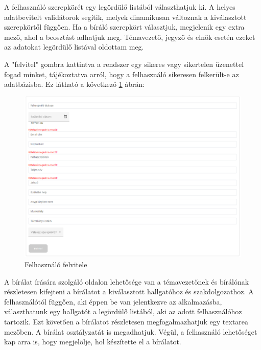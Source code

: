 A felhasználó szerepkörét egy legördülő listából választhatjuk ki. A helyes adatbevitelt validátorok segítik, melyek dinamikusan változnak a kiválasztott szerepkörtől függően. Ha a bíráló szerepkört választjuk, megjelenik egy extra mező, ahol a beosztást adhatjuk meg. Témavezető, jegyző és elnök esetén ezeket az adatokat legördülő listával oldottam meg.

A "felvitel" gombra kattintva a rendszer egy sikeres vagy sikertelen üzenettel fogad minket, tájékoztatva arról, hogy a felhasználó sikeresen felkerült-e az adatbázisba. Ez látható a következő \ref{fig:addUsers} ábrán:

\begin{figure}[h]
\centering
\includegraphics[width=\textwidth]{images/addUsers.png}
\caption{Felhasználó felvitele}
\label{fig:addUsers}
\end{figure}

\newpage


A bírálat írására szolgáló oldalon lehetősége van a témavezetőnek és bírálónak részletesen kifejteni a bírálatot a kiválasztott hallgatóhoz és szakdolgozathoz. A felhasználótól függően, aki éppen be van jelentkezve az alkalmazásba, választhatunk egy hallgatót a legördülő listából, aki az adott felhasználóhoz tartozik. Ezt követően a bírálatot részletesen megfogalmazhatjuk egy textarea mezőben. A bírálat osztályzatát is megadhatjuk. Végül, a felhasználó lehetőséget kap arra is, hogy megjelölje, hol készítette el a bírálatot.


